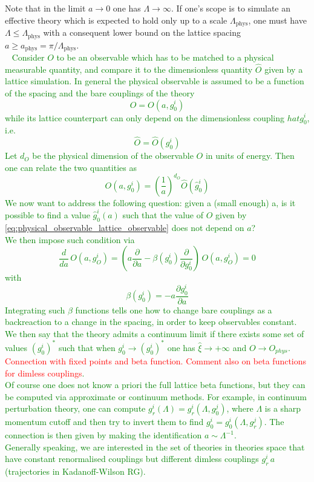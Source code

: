Note that in the limit $a \to 0$ one has $\Lambda \to \infty$. If one's scope is to simulate an effective theory which is expected to hold only up to a scale $\Lambda_\text{phys}$, one must have $\Lambda \leq \Lambda_\text{phys}$ with a consequent lower bound on the lattice spacing $a \geq a_\text{phys} = \pi / \Lambda_\text{phys}$. \\ ~
\textcolor{green}{Consider $O$ to be an observable which has to be matched to a physical measurable quantity, and compare it to the dimensionless quantity $\hat O$ given by a lattice simulation. In general the physical observable is assumed to be a function of the spacing and the bare couplings of the theory 
\begin{equation*}
    O = O(a, g^i_0)
\end{equation*}
while its lattice counterpart can only depend on the dimensionless coupling $hat g_0^i$, i.e.
\begin{equation*}
    \hat O = \hat O(g_0^i)
\end{equation*}
Let $d_O$ be the physical dimension of the observable $O$ in units of energy. Then one can relate the two quantities as 
\begin{equation}
    O(a, g^i_0) = \left(\frac{1}{a}\right)^{d_O} \hat O(\hat g_0^i)
    \label{eq:physical_observable_lattice_observable}
\end{equation}
We now want to address the following question: given a (small enough) a, is it possible to find a value $\hat g_0^i(a)$ such that the value of $O$ given by \eqref{eq:physical_observable_lattice_observable} does not depend on $a$? \\
We then impose such condition via 
\begin{equation*}
    \frac{d}{da} \, O(a, g^i_O) = \left(a\frac{\partial}{\partial a} - \beta(g_0^i) \frac{\partial}{\partial g_0^i}\right) \, O(a, g^i_O) = 0
\end{equation*}
with
\begin{equation*}
    \beta(g_0^i) = - a \frac{\partial g_0^i}{\partial a}
\end{equation*}
Integrating such $\beta$ functions tells one how to change bare couplings as a backreaction to a change in the spacing, in order to keep observables constant. We then say that the theory admits a continuum limit if there exists some set of values $(g_0^i)^*$ such that when $g_0^i \to (g_0^i)^*$ one has $\hat \xi \to +\infty$ and $O \to O_{phys}$. \textcolor{red}{Connection with fixed points and beta function. Comment also on beta functions for dimless couplings}. \\
Of course one does not know a priori the full lattice beta functions, but they can be computed via approximate or continuum methods. For example, in continuum perturbation theory, one can compute $g_r^i(\Lambda) = g_r^i(\Lambda, g_0^j)$, where $\Lambda$ is a sharp momentum cutoff and then try to invert them to find $g_0^i = g_0^i(\Lambda, g_r^j)$. The connection is then given by making the identification $a \sim \Lambda^{-1}$. \\
Generally speaking, we are interested in the set of theories in theories space that have constant renormalised couplings but different dimless couplings $g_r^i \, a$ (trajectories in Kadanoff-Wilson RG).}
